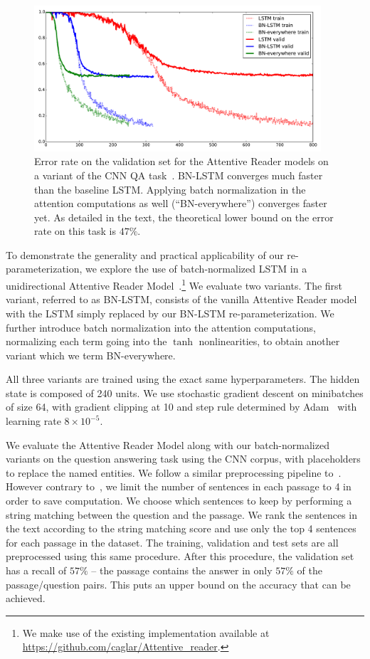 \documentclass{article} %
\begin{document}
\begin{figure}
\center
\includegraphics[width=0.95\textwidth]{figures/attr_valid.pdf}
\caption{
Error rate on the validation set for the Attentive Reader models on a variant of the CNN QA task~\cite{attentivereader}.
BN-LSTM converges much faster than the baseline LSTM.
Applying batch normalization in the attention computations as well (``BN-everywhere'') converges faster yet.
As detailed in the text, the theoretical lower bound on the error rate on this task is $47\%$.
}
\label{fig:attr_valid}
\end{figure}

To demonstrate the generality and practical applicability of our re-parameterization,
we explore the use of batch-normalized LSTM in a unidirectional Attentive Reader Model~\cite{attentivereader}.\footnote{We make use of the existing implementation available at \url{https://github.com/caglar/Attentive_reader}.}
We evaluate two variants.
The first variant, referred to as BN-LSTM, consists of the vanilla Attentive Reader model with the LSTM simply replaced by our BN-LSTM re-parameterization.
We further introduce batch normalization into the attention computations, normalizing each term going into the $\tanh$ nonlinearities, to obtain another variant which we term BN-everywhere.

All three variants are trained using the exact same hyperparameters.
The hidden state is composed of 240 units.
We use stochastic gradient descent on minibatches of size 64,
with gradient clipping at 10 and step rule determined by Adam~\cite{kingma2014adam}
with learning rate $8 \times 10^{-5}$.

We evaluate the Attentive Reader Model along with our batch-normalized variants on the question answering task using the CNN corpus, with placeholders to replace the named entities. We follow a similar preprocessing pipeline to~\cite{attentivereader}.
However contrary to~\cite{attentivereader}, we limit the number of sentences in each passage to 4 in order to save computation.
We choose which sentences to keep by performing a string matching between the question and the passage.
We rank the sentences in the text according to the string matching score and use only the top 4 sentences for each passage in the dataset.
The training, validation and test sets are all preprocessed using this same procedure.
After this procedure, the validation set has a recall of $57\%$ -- the passage contains the answer in only $57\%$ of the passage/question pairs.
This puts an upper bound on the accuracy that can be achieved.
\end{document}
